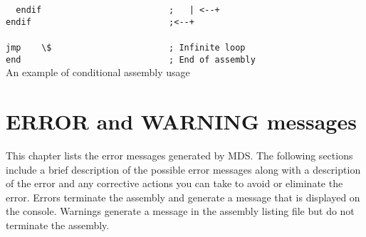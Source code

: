 \begin{code}[h!]
                        \verb'  '{\color{highlight_directive}\verb'endif'}\verb'                         '{\color{highlight_comment}\verb';   | <--+'}\\
                        {\color{highlight_directive}\verb'endif'}\verb'                           '{\color{highlight_comment}\verb';<--+'}\\
                        \verb''\\
                        {\color{highlight_instruction}\verb'jmp'}\verb'    '{\color{highlight_constant}\verb'\$'}\verb'                       '{\color{highlight_comment}\verb'; Infinite loop'}\\
                        {\color{highlight_directive}\verb'end'}\verb'                             '{\color{highlight_comment}\verb'; End of assembly'}\\
                        \caption{An example of conditional assembly usage}
                \end{code}


                \clearpage
        \section{ERROR and WARNING messages}
        This chapter lists the error messages generated by MDS. The following sections
        include a brief description of the possible error messages along with a
        description of the error and any corrective actions you can take to avoid or
        eliminate the error. Errors terminate the assembly and generate a message that is displayed on
        the console. Warnings generate a message in the assembly listing file but do not terminate the assembly.
